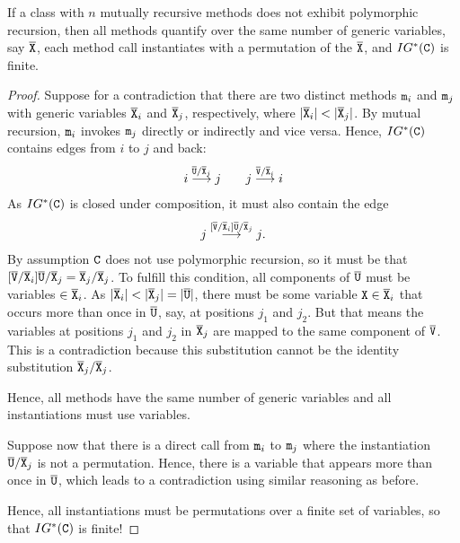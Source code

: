 \begin{proposition}
  If a class  with $n$ mutually recursive methods does not exhibit
  polymorphic recursion, then all methods quantify over the
  same number of generic variables, say $\overline{\tt X}$, each method call
  instantiates with a permutation of the $\overline{\tt X}$, and $IG^* ({\tt C})$ is finite.
\end{proposition}
\begin{proof}
  Suppose for a contradiction that there are two distinct methods ${\tt m}_i$ and
  ${\tt m}_j$ with generic variables $\overline{\tt X}_i$ and $\overline{\tt X}_j$, respectively,
  where $|\overline{\tt X}_i| < |\overline{\tt X}_j|$. By mutual recursion, ${\tt m}_i$ invokes
  ${\tt m}_j$ directly or indirectly and vice versa. Hence, $IG^* ({\tt C})$
  contains edges from $i$ to $j$ and back:
  \begin{gather*}
    i \stackrel{\overline{\tt U}/\overline{\tt X}_j}{\longrightarrow} j
    \qquad
    j \stackrel{\overline{\tt V}/\overline{\tt X}_i}{\longrightarrow} i
  \end{gather*}
  As $IG^*({\tt C})$ is closed under composition, it must also contain
  the edge
  \begin{gather*}
    j \stackrel{[\overline{\tt V}/\overline{\tt X}_i]\overline{\tt U}/\overline{\tt X}_j}{\longrightarrow} j
    \text{.}
  \end{gather*}
  By assumption ${\tt C}$ does not use polymorphic recursion, so it
  must be that $[\overline{\tt V}/\overline{\tt X}_i]\overline{\tt U}/\overline{\tt X}_j =
  \overline{\tt X}_j/\overline{\tt X}_j$. To fulfill this condition, all components of
  $\overline{\tt U}$ must be variables $\in \overline{\tt X}_i$. As  $|\overline{\tt X}_i| <
  |\overline{\tt X}_j| = |\overline{\tt U}|$, there must be some variable ${\tt X} \in \overline{\tt X}_i$ that
  occurs more than once in $\overline{\tt U}$, say, at positions $j_1$ and $j_2$. 
  But that means the variables at positions $j_1$ and $j_2$ in
  $\overline{\tt X}_j$ are mapped to the same component of $\overline{\tt V}$. This is a
  contradiction because this substitution cannot be the identity
  substitution $\overline{\tt X}_j/\overline{\tt X}_j$.

  Hence, all methods have the same number of generic variables and all
  instantiations must use variables.

  Suppose now that there is a direct call from ${\tt m}_i$ to
  ${\tt m}_j$ where the instantiation $\overline{\tt U}/\overline{\tt X}_j$ is not a permutation. Hence,
  there is a variable that appears more than once in $\overline{\tt U}$, which
  leads to a contradiction using similar reasoning as before.

  Hence, all instantiations must be permutations over a finite set of
  variables, so that $IG^*({\tt C})$ is finite! 
\end{proof}

